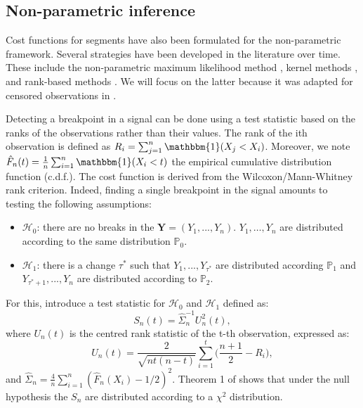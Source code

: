 \subsection{Non-parametric inference}


Cost functions for segments have also been formulated for the non-parametric framework. Several strategies have been developed in the literature over time. These include the non-parametric maximum likelihood method \citep{Zou2014,Einmahl2003}, kernel methods \citep{Harchaoui2008,li2015m}, and rank-based methods \citep{Pettitt1980,Wang2019}. We will focus on the latter because it was adapted for censored observations in \cite{lung2015}.  

Detecting a breakpoint in a signal can be done using a test statistic based on the ranks of the observations rather than their values. The rank of the ith observation is defined as $R_i = \sum_{j =1}^n\mathbbm{1}(X_j < X_i)$. Moreover, we note $\hat{F}_n(t) = \frac{1}{n}\sum_{i = 1}^n\mathbbm{1}(X_i < t)$ the empirical cumulative distribution function (c.d.f.). The cost function is derived from the Wilcoxon/Mann-Whitney rank criterion. Indeed, finding a single breakpoint in the signal amounts to testing the following assumptions:
\begin{itemize}
  \item $\mathcal{H}_0$: there are no breaks in the $\bm Y = (Y_1,...,Y_n)$. $Y_1,\dots,Y_n$ are distributed according to the same distribution $\mathbb{P}_0$. 
  \item $\mathcal{H}_1$: there is a change $\tau^*$ such that $Y_1,...,Y_{\tau^*}$ are distributed according $\mathbb{P}_1$ and $Y_{\tau^*+1},...,Y_{n}$ are distributed according to $\mathbb{P}_2$. 
\end{itemize}
For this, \cite{lung2015} introduce a test statistic for $\mathcal{H}_0$ and $\mathcal{H}_1$ defined as:
\begin{equation}\label{chp2:stattestnp}
  S_n(t) = \hat{\Sigma}_n^{-1} U^2_n(t),
\end{equation}
where $U_n(t)$ is the centred rank statistic of the t-th observation, expressed as: 
\begin{equation}\label{chp2:statranknp}
  U_n(t) = \frac{2}{\sqrt{nt(n-t)}}\sum_{i = 1}^{t}\bigg(\frac{n+1}{2} - R_i\bigg),
\end{equation}
and $\hat{\Sigma}_n = \frac{4}{n}\sum_{i=1}^n(\hat{F}_n(X_i)-1/2)^2$.
Theorem 1 of \cite{lung2015} shows that under the null hypothesis the $S_n$ are distributed according to a $\chi^2$ distribution. 

